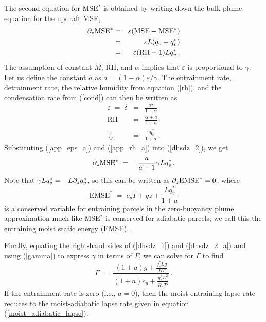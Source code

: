 \documentclass[12pt]{article}
\newcommand{\mse}{{\text{MSE}}}
\begin{document}
The second equation for $\mse{}^*$ is obtained by writing down the bulk-plume equation for the updraft MSE,
\begin{eqnarray}
\ppz \mse{}^* &=& \varepsilon (\mse{} - \mse{}^*) \nonumber \\
&=& \varepsilon L (q_v - q_v^*) \nonumber \\
&=& \varepsilon (\text{RH} - 1) L q_v^* \, . \label{dhsdz_2}
\end{eqnarray}
The assumption of constant $M$, RH, and $\alpha$ implies that $\varepsilon$ is proportional to $\gamma$.  Let us define the constant $a$ as $a = (1-\alpha)\varepsilon / \gamma$.  The entrainment rate, detrainment rate, the relative humidity from equation (\ref{rh}), and the condensation rate from (\ref{cond}) can then be written as
\begin{eqnarray}
\varepsilon \; = \; \delta &=& \frac{a\gamma}{1-\alpha} \label{app_eps_a} \\
\text{RH} &=& \frac{\alpha + a}{1 + a} \label{app_rh_a} \\
\frac{c}{M} &=& \frac{\gamma q_v^*}{1 + a} \, . \label{app_cond_a}
\end{eqnarray}
Substituting (\ref{app_eps_a}) and (\ref{app_rh_a}) into (\ref{dhsdz_2}), we get
\begin{equation}
\ppz \mse{}^* \; = \; - \frac{a}{a + 1} \gamma L q_v^* \, . \label{dhsdz_2_a}
\end{equation}
Note that $\gamma L q_v^* = -L\partial_z q_v^*$, so this can be written as $\partial_z \text{EMSE}^* = 0$, where
\begin{equation}
\text{EMSE}^* \; = \; c_p T + gz + \frac{Lq_v^*}{1+a} \label{app_emse}
\end{equation}
is a conserved variable for entraining parcels in the zero-buoyancy plume approximation much like MSE$^*$ is conserved for adiabatic parcels; we call this the entraining moist static energy (EMSE).


Finally, equating the right-hand sides of (\ref{dhsdz_1}) and (\ref{dhsdz_2_a}) and using (\ref{gamma}) to express $\gamma$ in terms of $\Gamma$, we can solve for $\Gamma$ to find
\begin{equation}
\Gamma \; = \; \frac{\displaystyle (1+a) g + \frac{q_v^* L g}{RT}}{\displaystyle (1+a)c_p + \frac{q_v^* L^2}{R_v T^2}} \, . \label{Gamma_a}
\end{equation}
If the entrainment rate is zero (i.e., $a=0$), then the moist-entraining lapse rate reduces to the moist-adiabatic lapse rate given in equation (\ref{moist_adiabatic_lapse}).
\end{document}
